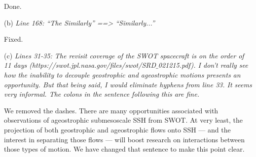 \documentclass[11pt]{article}
\newcommand{\bdp}{\begin{description}}
\newcommand{\edp}{\end{description}}
\begin{document}
\begin{enumerate}
  \bdp
      \item \noindent Done.
  \edp

  \subitem (b) {\it   Line 168: “The Similarly” ==> “Similarly...''}

  \bdp
      \item \noindent Fixed.
  \edp

  \subitem (c) {\it Lines 31-35: The revisit coverage of the SWOT spacecraft is on the order of 11 days
  (https://swot.jpl.nasa.gov/files/swot/SRD$\_$021215.pdf). I don’t really see how the
  inability to decouple geostrophic and ageostrophic motions presents an opportunity.
  But that being said, I would eliminate hyphens from line 33. It seems very informal.
  The colons in the sentence following this are fine.}

  \bdp
    \item {\noindent We removed the dashes. There are many opportunities associated with observations
          of ageostrophic submesoscale SSH from SWOT. At very least, the projection of both geostrophic
          and ageostrophic flows onto SSH --- and the interest in separating those flows --- will boost research
          on interactions between those types of motion. We have changed that sentence to make this point clear. }
  \edp

\end{enumerate}



\end{document}
